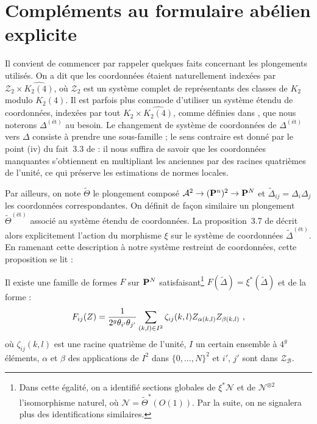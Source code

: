 \normalcolor


\section{Compléments au formulaire abélien explicite} \label{sec:form-ab2}

\color{gray}

Il convient de commencer par rappeler quelques faits concernant les
plongements utilisés. On a dit que les coordonnées étaient naturellement
indexées par $\mathcal{Z}_2 \times \widehat{K_2(4)}$, où $\mathcal{Z}_2$ est
un système complet de représentants des classes de $K_2$ modulo $K_2(4)$. Il
est parfois plus commode d'utiliser un système étendu de coordonnées, indexées
par tout $K_2 \times \widehat{K_2(4)}$, comme définies dans
\cite[p.~651]{daphimhva2}, que nous noterons $\Delta^{(\text{ét})}$ au
besoin. Le changement de système de coordonnées de $\Delta^{(\text{ét})}$ vers
$\Delta$ consiste à prendre une sous-famille ; le sens contraire est donné par
le point (iv) du fait~3.3 de  : il nous suffira de savoir que
les coordonnées manquantes s'obtiennent en multipliant les anciennes par des
racines quatrièmes de l'unité, ce qui préserve les estimations de normes
locales.

Par ailleurs, on note $\tilde\Theta$ le plongement composé $\mathcal A^2 \to
({\mathbf{P}}^n)^2 \to {\mathbf{P}}^N$ et $\tilde\Delta_{ij} = \Delta_i\Delta_j$ les
coordonnées correspondantes. On définit de façon similaire un plongement
$\tilde\Theta^{(\text{ét})}$ associé au système étendu de coordonnées. La
proposition~3.7 de \cite{daphimhva2} décrit alors explicitement l'action du
morphisme $\xi$ sur le système de coordonnées $\tilde\Delta^{(\text{ét})}$. En
ramenant cette description à notre système restreint de coordonnées, cette
proposition se lit :

\begin{fact}
  Il existe une famille de formes $F$ sur ${\mathbf{P}}^N$ satisfaisant\footnote{Dans
    cette égalité, on a identifié sections globales de $\xi^*\mathcal N$ et de
    $\mathcal N ^{\otimes 2}$  l'isomorphisme naturel, où $\mathcal N
    = \tilde\Theta^*(O(1))$. Par la suite, on ne signalera plus des
    identifications similaires.} $F(\tilde\Delta) = \xi^*(\tilde\Delta)$ et de
  la forme :
  \begin{equation}
    F_{ij}(Z) = \frac 1{2^g \theta_{i'}\theta_{j'}}\sum_{(k,l)\in I^2}
    \zeta_{ij}(k, l) Z_{\alpha(k, l)} Z_{\beta(k, l)} \text{ ,}
  \end{equation}
  où $\zeta_{ij}(k, l)$ est une racine quatrième de l'unité, $I$ un certain
  ensemble à $4^g$ éléments, $\alpha$ et $\beta$ des applications de $I^2$
  dans $\{0,\dots,N\}^2$ et $i'$, $j'$ sont dans $\mathcal Z_{\mathcal B}$.
\end{fact}

